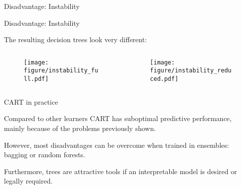 \documentclass[11pt,compress,t,notes=noshow, xcolor=table]{beamer}
\begin{document}
\begin{frame2}{Disadvantage: Instability}


\end{frame2}

\begin{frame2}{Disadvantage: Instability}

The resulting decision trees look very different:

\begin{columns}
\begin{column}{0.5\textwidth}
\begin{figure}
\texttt{[image: figure/instability\_full.pdf]} 
\end{figure}
\end{column}
\begin{column}{0.5\textwidth}
\begin{figure}
\texttt{[image: figure/instability\_reduced.pdf]} 
\end{figure}
\end{column}
\end{columns}

\end{frame2}

\begin{framei}{CART in practice}

\item Compared to other learners CART has suboptimal predictive performance, mainly because of the problems previously shown.
\item However, most disadvantages can be overcome when trained in ensembles: bagging or random forests.
\item Furthermore, trees are attractive tools if an interpretable model is desired or legally required.



\end{framei}
\end{document}
